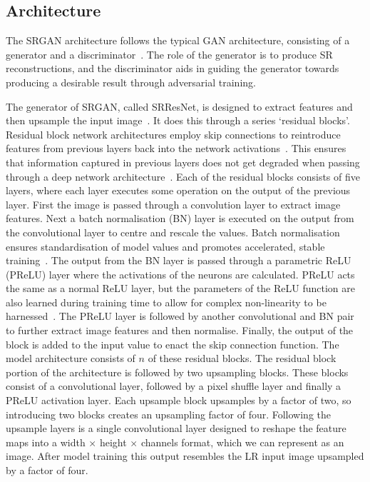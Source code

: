 \subsection{Architecture}\label{subsec:architecture}
The SRGAN architecture follows the typical GAN architecture, consisting of a generator and a discriminator~\cite{srgan,gan}. The role of the generator is to produce SR reconstructions, and the discriminator aids in guiding the generator towards producing a desirable result through adversarial training.

The generator of SRGAN, called SRResNet, is designed to extract features and then upsample the input image~\cite{srgan}. It does this through a series `residual blocks'. Residual block network architectures employ skip connections to reintroduce features from previous layers back into the network activations~\cite{residualNets}. This ensures that information captured in previous layers does not get degraded when passing through a deep network architecture~\cite{residualNets}. Each of the residual blocks consists of five layers, where each layer executes some operation on the output of the previous layer. First the image is passed through a convolution layer to extract image features. Next a batch normalisation (BN) layer is executed on the output from the convolutional layer to centre and rescale the values. Batch normalisation ensures standardisation of model values and promotes accelerated, stable training~\cite{batchNorm}. The output from the BN layer is passed through a parametric ReLU (PReLU) layer where the activations of the neurons are calculated. PReLU acts the same as a normal ReLU layer, but the parameters of the ReLU function are also learned during training time to allow for complex non-linearity to be harnessed~\cite{prelu}. The PReLU layer is followed by another convolutional and BN pair to further extract image features and then normalise. Finally, the output of the block is added to the input value to enact the skip connection function. The model architecture consists of $n$ of these residual blocks. The residual block portion of the architecture is followed by two upsampling blocks. These blocks consist of a convolutional layer, followed by a pixel shuffle layer and finally a PReLU activation layer. Each upsample block upsamples by a factor of two, so introducing two blocks creates an upsampling factor of four. Following the upsample layers is a single convolutional layer designed to reshape the feature maps into a width $\times$ height $\times$ channels format, which we can represent as an image. After model training this output resembles the LR input image upsampled by a factor of four.

